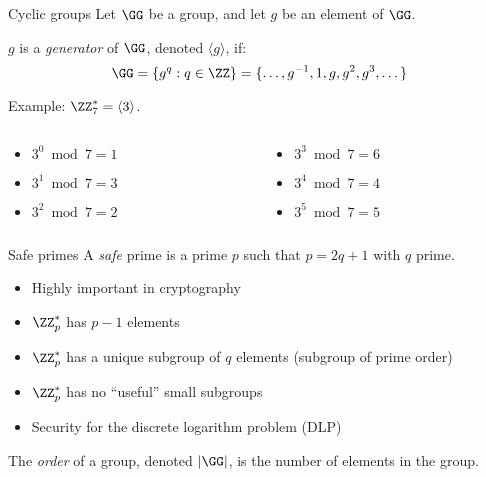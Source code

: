 \begin{frame}{Cyclic groups}
  \pause
  Let $\GG$ be a  group, and let $g$ be an element of $\GG$.

  $g$ is a \emph{generator} of $\GG$, denoted $\langle g\rangle$,  if:
  \[
    \GG = \{g^q:q\in\ZZ\} = \{\dots, g^{-1}, 1, g, g^2, g^3, \dots\}
  \]

  \pause
  Example: $\ZZ_7^* = \langle 3\rangle$.
  \pause
  \begin{columns}
    \begin{column}{0.3\textwidth}
      \begin{itemize}
        \item $3^0 \bmod{7} = 1$
        \item $3^1 \bmod{7} = 3$
        \item $3^2 \bmod{7} = 2$
      \end{itemize}
    \end{column}
    \begin{column}{0.3\textwidth}
      \begin{itemize}
        \item $3^3 \bmod{7} = 6$
        \item $3^4 \bmod{7} = 4$
        \item $3^5 \bmod{7} = 5$
      \end{itemize}
    \end{column}
  \end{columns}
\end{frame}

\begin{frame}{Safe primes}
  A \emph{safe} prime is a prime $p$ such that $p = 2q + 1$ with $q$ prime.
  \begin{itemize}[<+(1)->]
    \item Highly important in cryptography
    \item $\ZZ_p^*$ has $p-1$ elements
    \item $\ZZ_p^*$ has a unique subgroup of $q$ elements (subgroup of prime order)
    \item $\ZZ_p^*$ has no \enquote{useful} small subgroups
    \item Security for the discrete logarithm problem (DLP)
  \end{itemize}

  \vspace*{1em}
  \pause
  The \emph{order} of a group, denoted $\lvert\GG\rvert$, is the number of elements in the group.
\end{frame}

